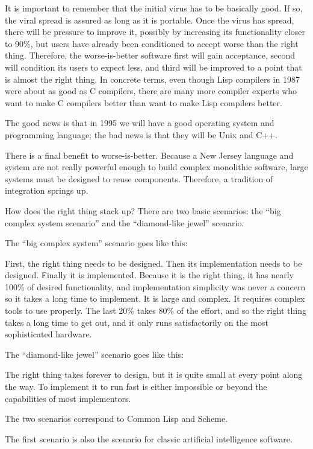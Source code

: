 \documentclass[10pt,twoside,openright]{memoir}
\begin{document}
It is important to remember that the initial virus has to be basically good. If so, the viral spread is assured as long as it is portable. Once the virus has spread, there will be pressure to improve it, possibly by increasing its functionality closer to 90\%, but users have already been conditioned to accept worse than the right thing. Therefore, the worse-is-better software first will gain acceptance, second will condition its users to expect less, and third will be improved to a point that is almost the right thing. In concrete terms, even though Lisp compilers in 1987 were about as good as C compilers, there are many more compiler experts who want to make C compilers better than want to make Lisp compilers better.

The good news is that in 1995 we will have a good operating system and programming language; the bad news is that they will be Unix and C++.

There is a final benefit to worse-is-better. Because a New Jersey language and system are not really powerful enough to build complex monolithic software, large systems must be designed to reuse components. Therefore, a tradition of integration springs up.

How does the right thing stack up? There are two basic scenarios: the ``big complex system scenario'' and the ``diamond-like jewel'' scenario.

The ``big complex system'' scenario goes like this:

First, the right thing needs to be designed. Then its implementation needs to be designed. Finally it is implemented. Because it is the right thing, it has nearly 100\% of desired functionality, and implementation simplicity was never a concern so it takes a long time to implement. It is large and complex. It requires complex tools to use properly. The last 20\% takes 80\% of the effort, and so the right thing takes a long time to get out, and it only runs satisfactorily on the most sophisticated hardware.

The ``diamond-like jewel'' scenario goes like this:

The right thing takes forever to design, but it is quite small at every point along the way. To implement it to run fast is either impossible or beyond the capabilities of most implementors.

The two scenarios correspond to Common Lisp and Scheme.

The first scenario is also the scenario for classic artificial intelligence software.
\end{document}
